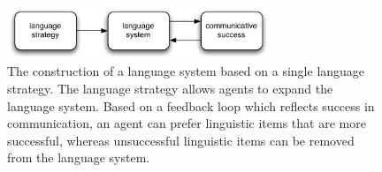 \begin{figure}
  \begin{center}
    \includegraphics[width=0.7\textwidth]{./intro/figures/strategies-1.pdf}
    \caption[The construction of a language system based on a single
    language strategy]{The construction of a language system based on
      a single language strategy. The language strategy allows agents
      to expand the language system. Based on a feedback loop which
      reflects success in communication, an agent can prefer linguistic
      items that are more successful, whereas unsuccessful linguistic items
      can be removed from the language system.}
    \label{f:strategies-1}
  \end{center}
\end{figure}

\addtocounter{chapter}{-1}

\thispagestyle{empty}









